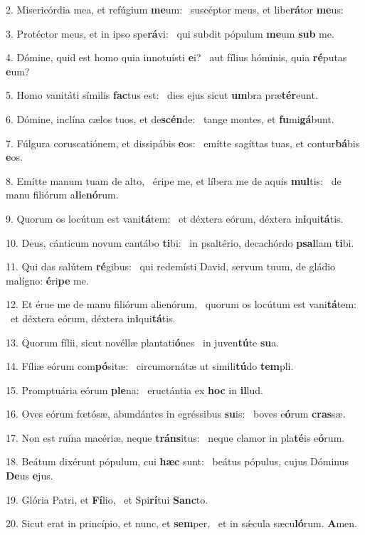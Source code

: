 2. Misericórdia mea, et refúgium \textbf{me}um: \ast\  suscéptor meus, et libe\textbf{rá}tor \textbf{me}us:\

3. Protéctor meus, et in ipso spe\textbf{rá}vi: \ast\  qui subdit pópulum \textbf{me}um \textbf{sub} me.\

4. Dómine, quid est homo quia innotuísti \textbf{e}i? \ast\  aut fílius hóminis, quia \textbf{ré}putas \textbf{e}um?\

5. Homo vanitáti símilis \textbf{fac}tus est: \ast\  dies ejus sicut \textbf{um}bra præ\textbf{tér}eunt.\

6. Dómine, inclína cælos tuos, et de\textbf{scén}de: \ast\  tange montes, et \textbf{fu}mi\textbf{gá}bunt.\

7. Fúlgura coruscatiónem, et dissipábis \textbf{e}os: \ast\  emítte sagíttas tuas, et contur\textbf{bá}bis \textbf{e}os.\

8. Emítte manum tuam de alto, \dag\  éripe me, et líbera me de aquis \textbf{mul}tis: \ast\  de manu filiórum a\textbf{li}e\textbf{nó}rum.\

9. Quorum os locútum est vani\textbf{tá}tem: \ast\  et déxtera eórum, déxtera in\textbf{i}qui\textbf{tá}tis.\

10. Deus, cánticum novum cantábo \textbf{ti}bi: \ast\  in psaltério, decachórdo \textbf{psal}lam \textbf{ti}bi.\

11. Qui das salútem \textbf{ré}gibus: \ast\  qui redemísti David, servum tuum, de gládio malígno: \textbf{é}ri\textbf{pe} me.\

12. Et érue me de manu filiórum alienórum, \dag\  quorum os locútum est vani\textbf{tá}tem: \ast\  et déxtera eórum, déxtera in\textbf{i}qui\textbf{tá}tis.\

13. Quorum fílii, sicut novéllæ plantati\textbf{ó}nes \ast\  in juven\textbf{tú}te \textbf{su}a.\

14. Fíliæ eórum com\textbf{pó}sitæ: \ast\  circumornátæ ut simili\textbf{tú}do \textbf{tem}pli.\

15. Promptuária eórum \textbf{ple}na: \ast\  eructántia ex \textbf{hoc} in \textbf{il}lud.\

16. Oves eórum fœtósæ, abundántes in egréssibus \textbf{su}is: \ast\  boves e\textbf{ó}rum \textbf{cras}sæ.\

17. Non est ruína macériæ, neque \textbf{tráns}itus: \ast\  neque clamor in pla\textbf{té}is e\textbf{ó}rum.\

18. Beátum dixérunt pópulum, cui \textbf{hæc} sunt: \ast\  beátus pópulus, cujus Dóminus \textbf{De}us \textbf{e}jus.\

19. Glória Patri, et \textbf{Fí}lio, \ast\  et Spi\textbf{rí}tui \textbf{Sanc}to.\

20. Sicut erat in princípio, et nunc, et \textbf{sem}per, \ast\  et in sǽcula sæcu\textbf{ló}rum. \textbf{A}men.\

